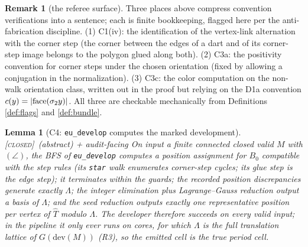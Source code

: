 \documentclass[11pt]{article}
\newtheorem{lemma}[theorem]{Lemma}
\theoremstyle{definition}
\newtheorem{remark}[theorem]{Remark}
\newcommand{\CLOSED}{\textnormal{\textsc{[closed]}}}
\newcommand{\dev}{\mathrm{dev}}
\begin{document}
\begin{remark}[the referee surface]\label{rem:referee}
Three places above compress convention verifications into a sentence; each is finite
bookkeeping, flagged here per the anti-fabrication discipline. (1) C1(iv): the
identification of the vertex-link alternation with the corner step (the corner between
the edges of a dart and of its corner-step image belongs to the polygon glued along
both). (2) C3a: the positivity convention for corner steps under the chosen orientation
(fixed by allowing a conjugation in the normalization). (3) C3c: the color computation
on the non-walk orientation class, written out in the proof but relying on the D1a
convention $c(y) = |{\rm face}(\sigma_2 y)|$. All three are checkable mechanically from
Definitions \ref{def:flags} and \ref{def:bundle}.
\end{remark}

\begin{lemma}[C4: \texttt{eu\_develop} computes the marked development]\label{lem:C4}
\CLOSED\ (abstract) + audit-facing\;
On input a finite connected closed valid $M$ with $(\angle)$, the BFS of
\texttt{eu\_develop} computes a position assignment for $B_0$ compatible with the step
rules (its \texttt{star} walk enumerates corner-step cycles; its glue step is the edge
step); it terminates within the guards; the recorded position discrepancies generate
exactly $\Lambda$; the integer elimination plus Lagrange--Gauss reduction output a basis
of $\Lambda$; and the seed reduction outputs exactly one representative position per
vertex of $\hat T$ modulo $\Lambda$. The developer therefore succeeds on every valid
input; in the pipeline it only ever runs on cores, for which $\Lambda$ is the full
translation lattice of $G(\dev(M))$ (R3), so the emitted cell is the true period cell.
\end{lemma}
\end{document}
